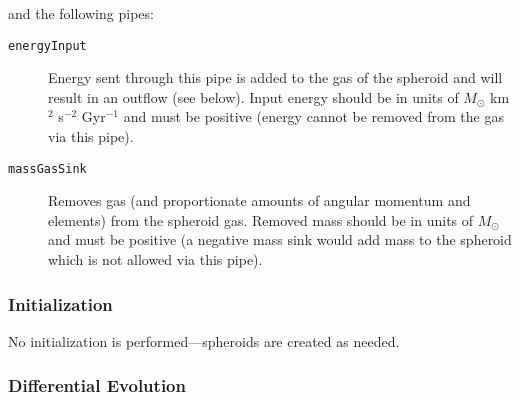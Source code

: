 and the following pipes:
\begin{description}
 \item [{\tt energyInput}] Energy sent through this pipe is added to the gas of the spheroid and will result in an outflow (see below). Input energy should be in units of $M_\odot$ km$^2$ s$^{-2}$ Gyr$^{-1}$ and must be positive (energy cannot be removed from the gas via this pipe).
 \item [{\tt massGasSink}] Removes gas (and proportionate amounts of angular momentum and elements) from the spheroid gas. Removed mass should be in units of $M_\odot$ and must be positive (a negative mass sink would add mass to the spheroid which is not allowed via this pipe).
\end{description}

\subsubsection{Initialization}

No initialization is performed---spheroids are created as needed.

\subsubsection{Differential Evolution}

